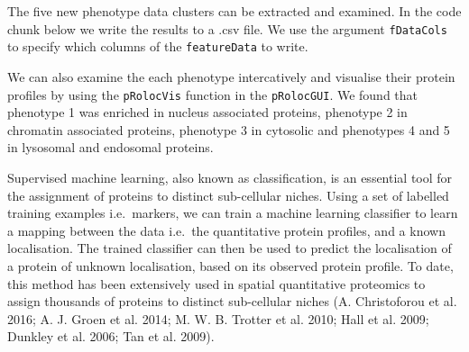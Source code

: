 The five new phenotype data clusters can be extracted and examined. In
the code chunk below we write the results to a .csv file. We use the
argument \texttt{fDataCols} to specify which columns of the
\texttt{featureData} to write.

\begin{Shaded}
\begin{Highlighting}[]
\StringTok{ }\NormalTok{(}
 \NormalTok{, } \NormalTok{, } \NormalTok{)}
\end{Highlighting}
\end{Shaded}

We can also examine the each phenotype intercatively and visualise their
protein profiles by using the \texttt{pRolocVis} function in the
\texttt{pRolocGUI}. We found that phenotype 1 was enriched in nucleus
associated proteins, phenotype 2 in chromatin associated proteins,
phenotype 3 in cytosolic and phenotypes 4 and 5 in lysosomal and
endosomal proteins.

\begin{Shaded}
\begin{Highlighting}[]
 \NormalTok{)}
\end{Highlighting}
\end{Shaded}


Supervised machine learning, also known as classification, is an
essential tool for the assignment of proteins to distinct sub-cellular
niches. Using a set of labelled training examples i.e.~markers, we can
train a machine learning classifier to learn a mapping between the data
i.e.~the quantitative protein profiles, and a known localisation. The
trained classifier can then be used to predict the localisation of a
protein of unknown localisation, based on its observed protein profile.
To date, this method has been extensively used in spatial quantitative
proteomics to assign thousands of proteins to distinct sub-cellular
niches (A. Christoforou et al. 2016; A. J. Groen et al. 2014; M. W. B.
Trotter et al. 2010; Hall et al. 2009; Dunkley et al. 2006; Tan et al.
2009).

